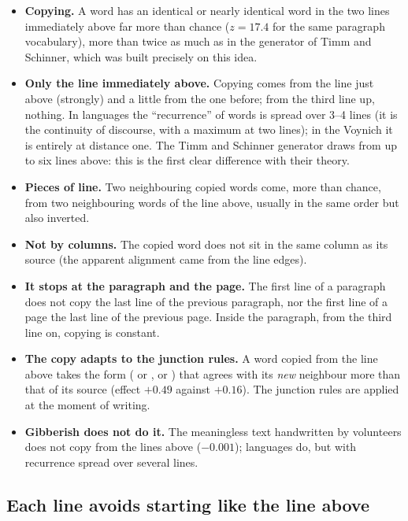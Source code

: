 \begin{itemize}
\item \textbf{Copying.} A word has an identical or nearly identical word in the two lines immediately above far more than
  chance ($z = 17.4$ for the same paragraph vocabulary), more than twice as much as in the generator of Timm and Schinner,
  which was built precisely on this idea.
\item \textbf{Only the line immediately above.} Copying comes from the line just above (strongly) and a little from the
  one before; from the third line up, nothing. In languages the ``recurrence'' of words is spread over 3--4 lines (it is
  the continuity of discourse, with a maximum at two lines); in the Voynich it is entirely at distance one. The Timm and
  Schinner generator draws from up to six lines above: this is the first clear difference with their theory.
\item \textbf{Pieces of line.} Two neighbouring copied words come, more than chance, from two neighbouring words of the
  line above, usually in the same order but also inverted.
\item \textbf{Not by columns.} The copied word does not sit in the same column as its source (the apparent alignment came
  from the line edges).
\item \textbf{It stops at the paragraph and the page.} The first line of a paragraph does not copy the last line of the
  previous paragraph, nor the first line of a page the last line of the previous page. Inside the paragraph, from the
  third line on, copying is constant.
\item \textbf{The copy adapts to the junction rules.} A word copied from the line above takes the form ( or
  ,  or ) that agrees with its \emph{new} neighbour more than that of its source (effect $+0.49$
  against $+0.16$). The junction rules are applied at the moment of writing.
\item \textbf{Gibberish does not do it.} The meaningless text handwritten by volunteers does not copy from the lines above
  ($-0.001$); languages do, but with recurrence spread over several lines.
\end{itemize}

\subsection{Each line avoids starting like the line above}


